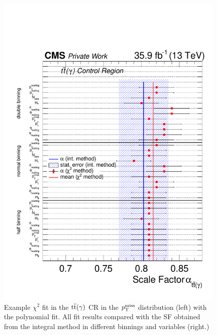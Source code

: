 \begin{figure}[tbp]
 \includegraphics[width=\pairwidth]{figures/plots_CR/chi/TT_Compare}
 \caption{Example $\chi^2$ fit in the ${\mathrm{t}\overline{\mathrm{t}}}(\gamma)$ CR in the $p_{\mathrm{T}}^\text{miss}$ distribution (left) with the polynomial fit. All fit results compared with the SF obtained from the integral method in different binnings and variables (right.)}
 \label{fig:chiTT}
\end{figure}

